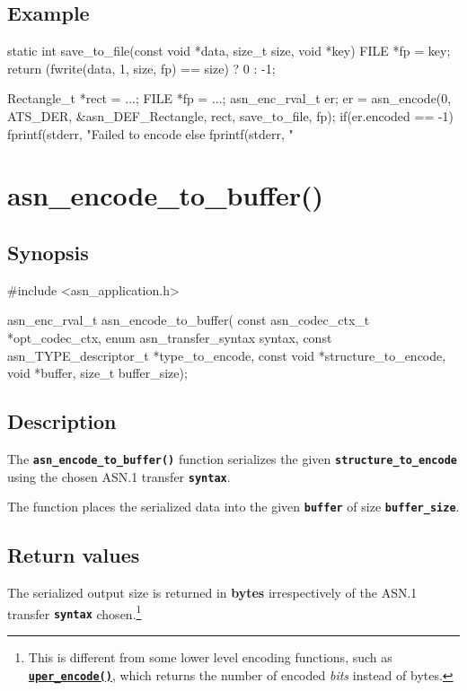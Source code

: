 \documentclass[english,oneside,12pt]{book}
\newcommand{\apisection}[2]{\clearpage\section{\label{#1}#2}}
\newcommand{\api}[2]{\hyperref[#1]{\code{#2}}}
\newcommand{\code}[1]{\texttt{\textbf{\lstinline{#1}}}}
\begin{document}
\subsection*{Example}
\begin{example}
static int
save_to_file(const void *data, size_t size, void *key) {
    FILE *fp = key;
    return (fwrite(data, 1, size, fp) == size) ? 0 : -1;
}

Rectangle_t *rect = ...;
FILE *fp = ...;
asn_enc_rval_t er;
er = asn_encode(0, ATS_DER, &asn_DEF_Rectangle, rect, save_to_file, fp);
if(er.encoded == -1) {
   fprintf(stderr, "Failed to encode %
} else {
   fprintf(stderr, "%
}
\end{example}

\apisection{sec:asn_encode_to_buffer}{asn\_encode\_to\_buffer()}

\subsection*{Synopsis}

\begin{signature}
#include <asn_application.h>

asn_enc_rval_t asn_encode_to_buffer(
    const asn_codec_ctx_t *opt_codec_ctx,
    enum asn_transfer_syntax syntax,
    const asn_TYPE_descriptor_t *type_to_encode,
    const void *structure_to_encode,
    void *buffer, size_t buffer_size);
\end{signature}

\subsection*{Description}

The \code{asn_encode_to_buffer()} function serializes the given \code{structure_to_encode} using the chosen ASN.1 transfer \code{syntax}.

The function places the serialized data into the given
\code{buffer} of size \code{buffer_size}.

\subsection*{Return values}


The serialized output size is returned in \textbf{bytes} irrespectively of the
ASN.1 transfer \code{syntax} chosen.\footnote{This is different from some
lower level encoding functions, such as \api{sec:uper_encode}{uper_encode()},
which returns the number of encoded \emph{bits} instead of bytes.}
\end{document}
